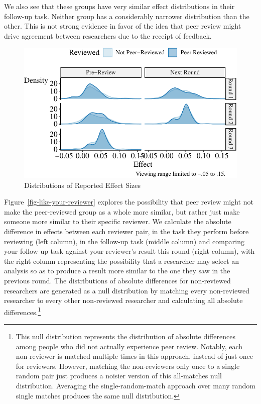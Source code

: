 \documentclass[
  letterpaper,
  DIV=11,
  numbers=noendperiod]{scrartcl}
\begin{document}
We also see that these groups have very similar effect distributions in
their follow-up task. Neither group has a considerably narrower
distribution than the other. This is not strong evidence in favor of the
idea that peer review might drive agreement between researchers due to
the receipt of feedback.

\begin{figure}

{\centering \includegraphics{The-Sources-of-Researcher-Variation-in-Economics_files/figure-pdf/fig-peer-review-effect-distributions-1.pdf}

}

\caption{\label{fig-peer-review-effect-distributions}Distributions of
Reported Effect Sizes}

\end{figure}

Figure~\ref{fig-like-your-reviewer} explores the possibility that peer
review might not make the peer-reviewed group as a whole more similar,
but rather just make someone more similar to their specific reviewer. We
calculate the absolute difference in effects between each reviewer pair,
in the task they perform before reviewing (left column), in the
follow-up task (middle column) and comparing your follow-up task against
your reviewer's result this round (right column), with the right column
representing the possibility that a researcher may select an analysis so
as to produce a result more similar to the one they saw in the previous
round. The distributions of absolute differences for non-reviewed
researchers are generated as a null distribution by matching every
non-reviewed researcher to every other non-reviewed researcher and
calculating all absolute differences.\footnote{This null distribution
  represents the distribution of absolute differences among people who
  did not actually experience peer review. Notably, each non-reviewer is
  matched multiple times in this approach, instead of just once for
  reviewers. However, matching the non-reviewers only once to a single
  random pair just produces a noisier version of this all-matches null
  distribution. Averaging the single-random-match approach over many
  random single matches produces the same null distribution.}
\end{document}
